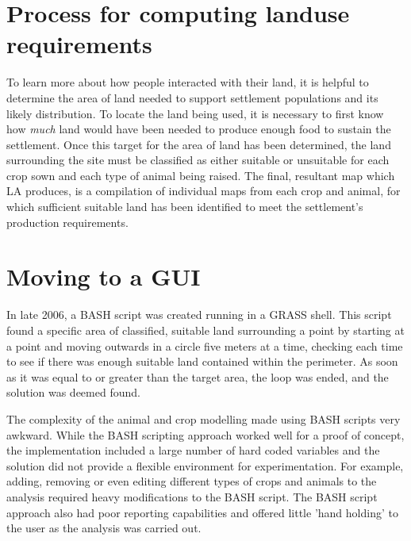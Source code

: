 \section{Process for computing landuse requirements} 
\label{sec:EarlyAttempts} 
  To learn more about how people interacted with their land, it is
  helpful to determine the area of land needed to support settlement
  populations and its likely distribution.  To locate the land being used, it is
  necessary to first know how \textit{much} land would have been needed to
  produce enough food to sustain the settlement.  Once this target for the area of land
  has been determined, the land surrounding the site must be classified as
  either suitable or unsuitable for each crop sown and each type of animal being
  raised.  The final, resultant map which LA produces, is a compilation of individual
  maps from each crop and animal, for which sufficient suitable land has been
  identified to meet the settlement's production requirements.
\section{Moving to a GUI} \label{GUI} 
  In late 2006, a BASH script was created running in a GRASS shell. This script
  found a specific area of classified, suitable land surrounding a point by
  starting at a point and moving outwards in a circle five meters at a time,
  checking each time to see if there was enough suitable land contained within
  the perimeter. As soon as it was equal to or greater than the target area, the
  loop was ended, and the solution was deemed found.

  The complexity of the animal and crop modelling made using BASH scripts very
  awkward.  While the BASH scripting approach worked well for a proof of
  concept, the implementation included a large number of hard coded variables and the
  solution did not provide a flexible environment for experimentation. For
  example, adding, removing or even editing different types of crops and animals
  to the analysis required heavy modifications to the BASH script.  The BASH
  script approach also had poor reporting capabilities and offered
  little 'hand holding' to the user as the analysis was carried out.

